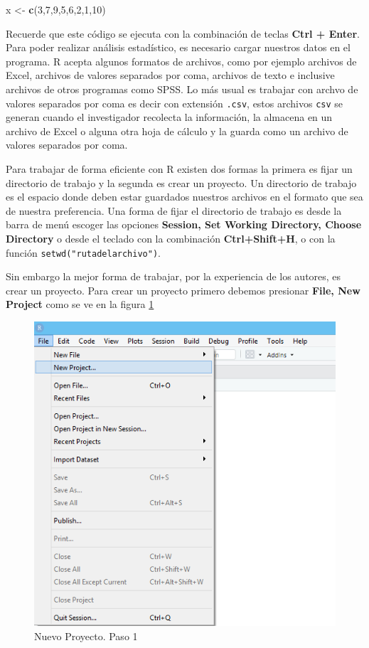 \documentclass[]{book}
\newenvironment{Shaded}{\begin{snugshade}}{\end{snugshade}}
\newcommand{\DecValTok}[1]{\textcolor[rgb]{0.00,0.00,0.81}{#1}}
\newcommand{\KeywordTok}[1]{\textcolor[rgb]{0.13,0.29,0.53}{\textbf{#1}}}
\newcommand{\NormalTok}[1]{#1}
\newcommand{\StringTok}[1]{\textcolor[rgb]{0.31,0.60,0.02}{#1}}
\begin{document}
\begin{Shaded}
\begin{Highlighting}[]
\NormalTok{x <-}\StringTok{ }\KeywordTok{c}\NormalTok{(}\DecValTok{3}\NormalTok{,}\DecValTok{7}\NormalTok{,}\DecValTok{9}\NormalTok{,}\DecValTok{5}\NormalTok{,}\DecValTok{6}\NormalTok{,}\DecValTok{2}\NormalTok{,}\DecValTok{1}\NormalTok{,}\DecValTok{10}\NormalTok{) }
\end{Highlighting}
\end{Shaded}

Recuerde que este código se ejecuta con la combinación de teclas \textbf{Ctrl + Enter}. Para poder realizar análisis estadístico, es necesario cargar nuestros datos en el programa. R acepta algunos formatos de archivos, como por ejemplo archivos de Excel, archivos de valores separados por coma, archivos de texto e inclusive archivos de otros programas como SPSS. Lo más usual es trabajar con archvo de valores separados por coma es decir con extensión \texttt{.csv}, estos archivos \texttt{csv} se generan cuando el investigador recolecta la información, la almacena en un archivo de Excel o alguna otra hoja de cálculo y la guarda como un archivo de valores separados por coma.

Para trabajar de forma eficiente con R existen dos formas la primera es fijar un directorio de trabajo y la segunda es crear un proyecto. Un directorio de trabajo es el espacio donde deben estar guardados nuestros archivos en el formato que sea de nuestra preferencia. Una forma de fijar el directorio de trabajo es desde la barra de menú escoger las opciones \textbf{Session, Set Working Directory, Choose Directory} o desde el teclado con la combinación \textbf{Ctrl+Shift+H}, o con la función \texttt{setwd("rutadelarchivo")}.

Sin embargo la mejor forma de trabajar, por la experiencia de los autores, es crear un proyecto. Para crear un proyecto primero debemos presionar \textbf{File, New Project} como se ve en la figura \ref{fig:project1}

\begin{figure}[h!]

{\centering \includegraphics[width=0.5\linewidth]{project1} 

}

\caption{Nuevo Proyecto. Paso 1}\label{fig:project1}
\end{figure}
\end{document}
